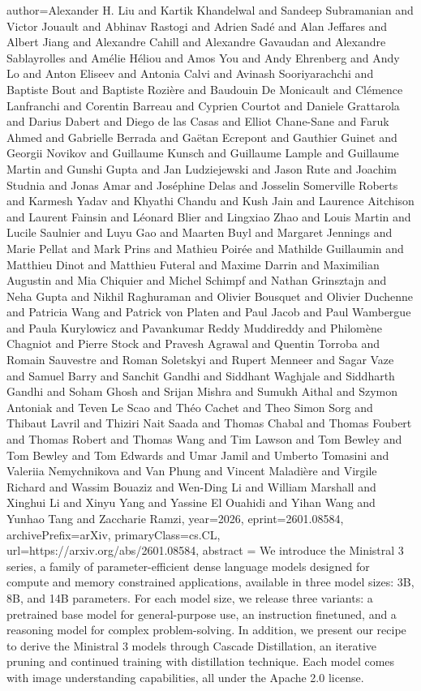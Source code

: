 {      author={Alexander H. Liu and Kartik Khandelwal and Sandeep Subramanian and Victor Jouault and Abhinav Rastogi and Adrien Sadé and Alan Jeffares and Albert Jiang and Alexandre Cahill and Alexandre Gavaudan and Alexandre Sablayrolles and Amélie Héliou and Amos You and Andy Ehrenberg and Andy Lo and Anton Eliseev and Antonia Calvi and Avinash Sooriyarachchi and Baptiste Bout and Baptiste Rozière and Baudouin De Monicault and Clémence Lanfranchi and Corentin Barreau and Cyprien Courtot and Daniele Grattarola and Darius Dabert and Diego de las Casas and Elliot Chane-Sane and Faruk Ahmed and Gabrielle Berrada and Gaëtan Ecrepont and Gauthier Guinet and Georgii Novikov and Guillaume Kunsch and Guillaume Lample and Guillaume Martin and Gunshi Gupta and Jan Ludziejewski and Jason Rute and Joachim Studnia and Jonas Amar and Joséphine Delas and Josselin Somerville Roberts and Karmesh Yadav and Khyathi Chandu and Kush Jain and Laurence Aitchison and Laurent Fainsin and Léonard Blier and Lingxiao Zhao and Louis Martin and Lucile Saulnier and Luyu Gao and Maarten Buyl and Margaret Jennings and Marie Pellat and Mark Prins and Mathieu Poirée and Mathilde Guillaumin and Matthieu Dinot and Matthieu Futeral and Maxime Darrin and Maximilian Augustin and Mia Chiquier and Michel Schimpf and Nathan Grinsztajn and Neha Gupta and Nikhil Raghuraman and Olivier Bousquet and Olivier Duchenne and Patricia Wang and Patrick von Platen and Paul Jacob and Paul Wambergue and Paula Kurylowicz and Pavankumar Reddy Muddireddy and Philomène Chagniot and Pierre Stock and Pravesh Agrawal and Quentin Torroba and Romain Sauvestre and Roman Soletskyi and Rupert Menneer and Sagar Vaze and Samuel Barry and Sanchit Gandhi and Siddhant Waghjale and Siddharth Gandhi and Soham Ghosh and Srijan Mishra and Sumukh Aithal and Szymon Antoniak and Teven Le Scao and Théo Cachet and Theo Simon Sorg and Thibaut Lavril and Thiziri Nait Saada and Thomas Chabal and Thomas Foubert and Thomas Robert and Thomas Wang and Tim Lawson and Tom Bewley and Tom Bewley and Tom Edwards and Umar Jamil and Umberto Tomasini and Valeriia Nemychnikova and Van Phung and Vincent Maladière and Virgile Richard and Wassim Bouaziz and Wen-Ding Li and William Marshall and Xinghui Li and Xinyu Yang and Yassine El Ouahidi and Yihan Wang and Yunhao Tang and Zaccharie Ramzi},
      year={2026},
      eprint={2601.08584},
      archivePrefix={arXiv},
      primaryClass={cs.CL},
      url={https://arxiv.org/abs/2601.08584},
      abstract = {We introduce the Ministral 3 series, a family of parameter-efficient dense language models designed for compute and memory constrained applications, available in three model sizes: 3B, 8B, and 14B parameters. For each model size, we release three variants: a pretrained base model for general-purpose use, an instruction finetuned, and a reasoning model for complex problem-solving. In addition, we present our recipe to derive the Ministral 3 models through Cascade Distillation, an iterative pruning and continued training with distillation technique. Each model comes with image understanding capabilities, all under the Apache 2.0 license.}
}
